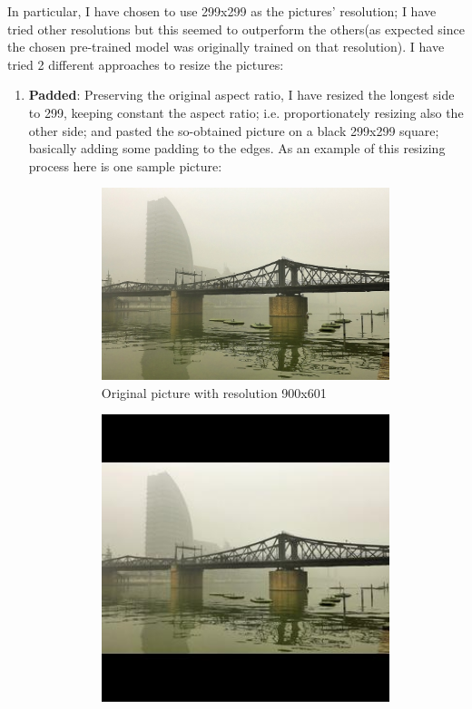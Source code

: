 \documentclass[a4paper]{article}
\begin{document}
In particular, I have chosen to use 299x299 as the pictures' resolution; I have tried other resolutions but this seemed to outperform the others(as expected since the chosen pre-trained model was originally trained on that resolution). I have tried 2 different approaches to resize the pictures:
\begin{enumerate}
\item \textbf{Padded}: Preserving the original aspect ratio, I have resized the longest side to 299, keeping constant the aspect ratio; i.e. proportionately resizing also the other side; and pasted the so-obtained picture on a black 299x299 square; basically adding some padding to the edges. As an example of this resizing process here is one sample picture:

\begin{figure} [h!]
\centering
\begin{subfigure}{0.5\textwidth}
  \centering
  \includegraphics[width=0.99\textwidth]{HAZE-1-1-1_001_ORI.jpg}
  \caption{Original picture with resolution 900x601}
  \label{fig:sub1}
\end{subfigure}%
\begin{subfigure}{0.5\textwidth}
  \centering
  \includegraphics[width=0.99\textwidth]{HAZE-1-1-1_001_ORI_resized.jpg}

\end{subfigure}
\end{figure}
\end{enumerate}
\end{document}
